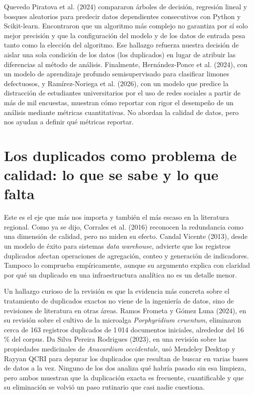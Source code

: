 \documentclass[11pt,openany,oneside,letterpaper]{book}
\newcommand{\seccioncorta}[2]{{\renewcommand{\sectionmark}[1]{}\section{#2}}\markright{\MakeUppercase{\thesection.\ #1}}}
\begin{document}
Quevedo Piratova et al. (2024) compararon árboles de decisión, regresión lineal y bosques aleatorios para predecir datos dependientes consecutivos con Python y Scikit-learn. Encontraron que un algoritmo más complejo no garantiza por sí solo mejor precisión y que la configuración del modelo y de los datos de entrada pesa tanto como la elección del algoritmo. Ese hallazgo refuerza nuestra decisión de aislar una sola condición de los datos (los duplicados) en lugar de atribuir las diferencias al método de análisis. Finalmente, Hernández-Ponce et al. (2024), con un modelo de aprendizaje profundo semisupervisado para clasificar limones defectuosos, y Ramírez-Noriega et al. (2026), con un modelo que predice la distracción de estudiantes universitarios por el uso de redes sociales a partir de más de mil encuestas, muestran cómo reportar con rigor el desempeño de un análisis mediante métricas cuantitativas. No abordan la calidad de datos, pero nos ayudan a definir qué métricas reportar.

\seccioncorta{Los duplicados como problema de calidad}{Los duplicados como problema de calidad: lo que se sabe y lo que falta}

Este es el eje que más nos importa y también el más escaso en la literatura regional. Como ya se dijo, Corrales et al. (2016) reconocen la redundancia como una dimensión de calidad, pero no miden su efecto. Candal Vicente (2013), desde un modelo de éxito para sistemas \emph{data warehouse}, advierte que los registros duplicados afectan operaciones de agregación, conteo y generación de indicadores. Tampoco lo comprueba empíricamente, aunque su argumento explica con claridad por qué un duplicado en una infraestructura analítica no es un detalle menor.

Un hallazgo curioso de la revisión es que la evidencia más concreta sobre el tratamiento de duplicados exactos no viene de la ingeniería de datos, sino de revisiones de literatura en otras áreas. Ramos Frometa y Gómez Luna (2024), en su revisión sobre el cultivo de la microalga \emph{Porphyridium cruentum}, eliminaron cerca de 163 registros duplicados de 1\,014 documentos iniciales, alrededor del 16\,\% del corpus. Da Silva Pereira Rodrigues (2023), en una revisión sobre las propiedades medicinales de \emph{Anacardium occidentale}, usó Mendeley Desktop y Rayyan QCRI para depurar los duplicados que resultan de buscar en varias bases de datos a la vez. Ninguno de los dos analiza qué habría pasado sin esa limpieza, pero ambos muestran que la duplicación exacta es frecuente, cuantificable y que su eliminación se volvió un paso rutinario que casi nadie cuestiona.
\end{document}
